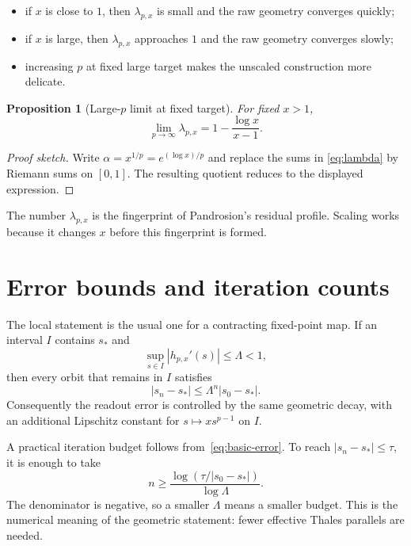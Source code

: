 \documentclass[11pt,a4paper]{article}
\theoremstyle{plain}
\newtheorem{proposition}[theorem]{Proposition}
\theoremstyle{definition}
\theoremstyle{remark}
\newcommand{\hp}{h_{p,x}}
\newenvironment{takeaway}{%
  \begin{center}\begin{minipage}{0.92\linewidth}\small\itshape\color{blue!45!black}%
}{%
  \end{minipage}\end{center}%
}
\begin{document}
\begin{itemize}
  \item if $x$ is close to $1$, then $\lambda_{p,x}$ is small and the raw
  geometry converges quickly;
  \item if $x$ is large, then $\lambda_{p,x}$ approaches $1$ and the raw
  geometry converges slowly;
  \item increasing $p$ at fixed large target makes the unscaled construction
  more delicate.
\end{itemize}

\begin{proposition}[Large-$p$ limit at fixed target]
For fixed $x>1$,
\[
  \lim_{p\to\infty}\lambda_{p,x}
  =1-\frac{\log x}{x-1}.
\]
\end{proposition}

\begin{proof}[Proof sketch]
Write $\alpha=x^{1/p}=e^{(\log x)/p}$ and replace the sums in
\eqref{eq:lambda} by Riemann sums on $[0,1]$.  The resulting quotient reduces
to the displayed expression.
\end{proof}

\begin{takeaway}
The number $\lambda_{p,x}$ is the fingerprint of Pandrosion's residual
profile.  Scaling works because it changes $x$ before this fingerprint is
formed.
\end{takeaway}

\section{Error bounds and iteration counts}
\label{sec:bounds}

The local statement is the usual one for a contracting fixed-point map.  If an
interval $I$ contains $s_*$ and
\[
  \sup_{s\in I}|\hp'(s)|\le \Lambda<1,
\]
then every orbit that remains in $I$ satisfies
\begin{equation}
  |s_n-s_*|\le \Lambda^n |s_0-s_*|.
  \label{eq:basic-error}
\end{equation}
Consequently the readout error is controlled by the same geometric decay,
with an additional Lipschitz constant for $s\mapsto xs^{p-1}$ on $I$.

A practical iteration budget follows from~\eqref{eq:basic-error}.  To reach
$|s_n-s_*|\le \tau$, it is enough to take
\begin{equation}
  n\ge
  \frac{\log(\tau/|s_0-s_*|)}{\log \Lambda}.
  \label{eq:budget}
\end{equation}
The denominator is negative, so a smaller $\Lambda$ means a smaller budget.
This is the numerical meaning of the geometric statement: fewer effective
Thales parallels are needed.
\end{document}
